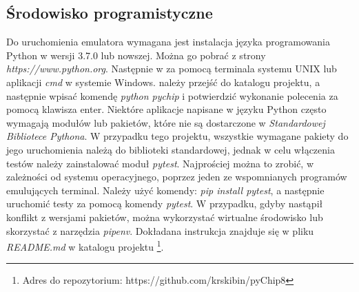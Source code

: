 \newpage

\subsection{Środowisko programistyczne}
Do uruchomienia emulatora wymagana jest instalacja języka programowania Python w wersji 3.7.0 lub nowszej. Można go pobrać z strony  \\ \textit{https://www.python.org}. Następnie w za pomocą terminala systemu UNIX lub aplikacji \textit{cmd} w systemie Windows. należy przejść do katalogu projektu, a następnie wpisać komendę \textit{python pychip} i potwierdzić wykonanie polecenia za pomocą klawisza enter. Niektóre aplikacje napisane w języku Python często wymagają modułów lub pakietów, które nie są dostarczone w \textit{Standardowej Bibliotece Pythona}. W przypadku tego projektu, wszystkie wymagane pakiety do jego uruchomienia należą do biblioteki standardowej, jednak w celu włączenia testów należy zainstalować moduł \textit{pytest}. Najprościej można to zrobić, w zależności od systemu operacyjnego, poprzez jeden ze wspomnianych programów emulujących terminal. Należy użyć komendy: \textit{pip install pytest}, a następnie uruchomić testy za pomocą komendy \textit{pytest}. W przypadku, gdyby nastąpił konflikt z wersjami pakietów, można wykorzystać wirtualne środowisko lub skorzystać z narzędzia \textit{pipenv}. Dokładana instrukcja znajduje się w pliku \textit{README.md} w katalogu projektu \footnote{Adres do repozytorium: https://github.com/krskibin/pyChip8}.